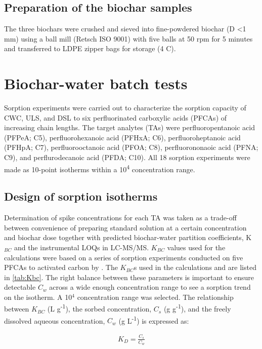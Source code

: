 \subsection{Preparation of the biochar samples}
The three biochars were crushed and sieved into fine-powdered biochar (D \textless 1 mm) using a ball mill (Retsch ISO 9001) with five balls at 50 rpm for 5 minutes and transferred to LDPE zipper bags for storage (4 \textdegree C). 


\section{Biochar-water batch tests}
Sorption experiments were carried out to characterize the sorption capacity of CWC, ULS, and DSL to six perfluorinated carboxylic acids (PFCAs) of increasing chain lengths. The target analytes (TAs) were perfluoropentanoic acid (PFPeA; C5), perfluorohexanoic acid (PFHxA; C6), perfluoroheptanoic acid (PFHpA; C7), perfluorooctanoic acid (PFOA; C8), perfluorononaoic acid (PFNA; C9), and perflurodecanoic acid (PFDA; C10). All 18 sorption experiments were made as 10-point isotherms within a 10\textsuperscript{4} concentration range. 

\subsection{Design of sorption isotherms}
Determination of spike concentrations for each TA was taken as a trade-off between convenience of preparing standard solution at a certain concentration and biochar dose together with predicted biochar-water partition coefficients, K$_{BC}$ and the instrumental LOQs in LC-MS/MS. $K_{BC}$ values used for the calculations were based on a series of sorption experiments conducted on five PFCAs to activated carbon by \cite{Xiao2017}. The $K_{BC}$s used in the calculations and are listed in \cref{tab:Kbc}. The right balance between these parameters is important to ensure detectable $C_w$ across a wide enough concentration range to see a sorption trend on the isotherm. A 10$^4$ concentration range was selected. The relationship between $K_{BC}$ (L g\textsuperscript{-1}), the sorbed concentration, $C_s$ (\textmu g g\textsuperscript{-1}), and the freely dissolved aqueous concentration, $C_w$ (\textmu g L\textsuperscript{-1}) is expressed as:

\begin{align}
    \label{eq:Kbc1}
    K_{D} = \frac{C_s}{C_w}
\end{align}

